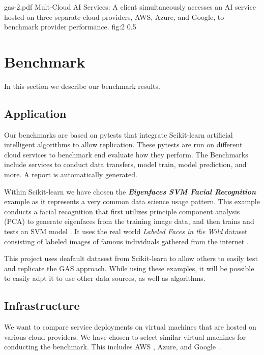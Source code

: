 \OneFIGURE
  {gas-2.pdf}
  {Mult-Cloud AI Services: A client simultaneously accesses an AI service hosted
   on three separate cloud providers, AWS, Azure, and Google, to benchmark
   provider performance.}
  {fig:2}
  {0.5}

\section{Benchmark}
\label{sec:benchmark}

In this section we describe our benchmark results.

\subsection{Application}

Our benchmarks are based on pytests that integrate Scikit-learn
artificial intelligent algorithms to allow replication. These pytests
are run on different cloud services to benchmark end evaluate how they
perform. The Benchmarks include services to conduct data transfers,
model train, model prediction, and more. A report is automatically generated. 

Within Scikit-learn we have chosen the {\bf\em Eigenfaces SVM Facial
Recognition} example as it represents a very common data science usage
pattern. This example conducts a facial recognition that first
utilizes principle component analysis (PCA) to generate eigenfaces
from the training image data, and then trains and tests an SVM
model \cite{www-skikit-learn-faces}. It uses the real world
{\em Labeled Faces in the Wild} dataset consisting of labeled images
of famous individuals gathered from the internet \cite{faces-data}.

This project uses deafault datasest from Scikit-learn to allow others
to easily test and replicate the GAS approach. While using these
examples, it will be possible to easily adpt it to use other data
sources, as well as algorithms.


\subsection{Infrastructure}

We want to compare service
deployments on virtual machines that are hosted on various cloud
providers. We have chosen to select similar virtual machines for
conducting the benchmark. This includes AWS \cite{www-aws},
Azure\cite{www-azure}, and Google \cite{www-google}.

